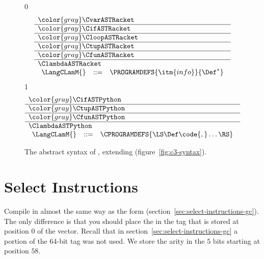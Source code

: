 \documentclass[7x10]{TimesAPriori_MIT}%
\newcommand{\gray}[1]{{\color{gray} #1}}
\def\racketEd{0}
\def\pythonEd{1}
\def\edition{1}
\newcommand{\pythonColor}[0]{}
\numberwithin{theorem}{chapter}
\numberwithin{definition}{chapter}
\numberwithin{equation}{chapter}
\begin{document}
\begin{figure}[tp]
  \begin{tcolorbox}[colback=white]
\small
{\if\edition\racketEd
\[
\begin{array}{l}
  \gray{\CvarASTRacket} \\ \hline
  \gray{\CifASTRacket} \\ \hline
  \gray{\CloopASTRacket} \\ \hline
  \gray{\CtupASTRacket} \\ \hline
  \gray{\CfunASTRacket} \\ \hline
  \ClambdaASTRacket \\
\begin{array}{lcl}
\LangCLamM{} & ::= & \PROGRAMDEFS{\itm{info}}{\Def^{*}}
\end{array}
\end{array}
\]
\fi}
{\if\edition\pythonEd\pythonColor
\[
  \begin{array}{l}
  \gray{\CifASTPython} \\ \hline
  \gray{\CtupASTPython} \\ \hline
  \gray{\CfunASTPython} \\ \hline
  \ClambdaASTPython \\
  \begin{array}{lcl}
    \LangCLamM{} & ::= & \CPROGRAMDEFS{\LS\Def\code{,}\ldots\RS} 
  \end{array}
  \end{array}
\]
\fi}
  \end{tcolorbox}

\caption{The abstract syntax of \LangCLam{}, extending \LangCFun{} (figure~\ref{fig:c3-syntax}).}
\label{fig:Clam-syntax}
\end{figure}


\section{Select Instructions}
\label{sec:select-instructions-Llambda}

Compile  in almost the
same way as the  form
(section~\ref{sec:select-instructions-gc}). The only difference is
that you should place the  in the tag that is stored at
position $0$ of the vector. Recall that in
section~\ref{sec:select-instructions-gc} a portion of the 64-bit tag
was not used. We store the arity in the $5$ bits starting at position
$58$.
\end{document}
